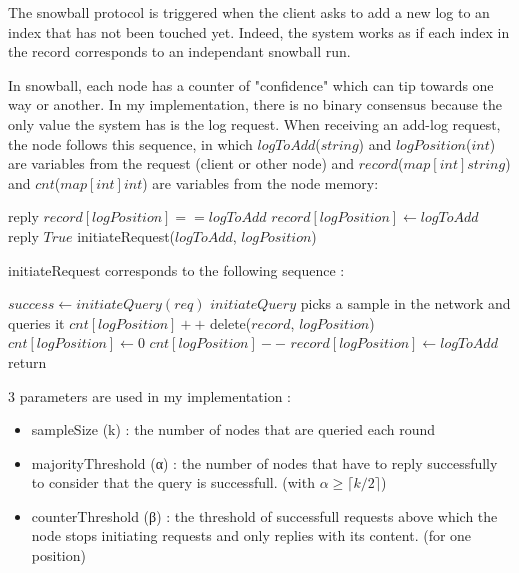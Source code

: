 \documentclass[11pt, twocolumn]{article}
\begin{document}
The snowball protocol is triggered when the client asks to add a new log to an index that has not been touched yet. Indeed, the system works as if each index in the record corresponds to an independant snowball run.

In snowball, each node has a counter of "confidence" which can tip towards one way or another. In my implementation, there is no binary consensus because the only value the system has is the log request.
When receiving an add-log request, the node follows this sequence, in which $logToAdd$($string$) and $logPosition$($int$) are variables from the request (client or other node) and $record$($map[int]string$) and $cnt$($map[int]int$) are variables from the node memory:
\begin{algorithmic}
    \State reply $record[logPosition] == logToAdd$
    \Else
    \State $record[logPosition] \gets logToAdd$
    \State reply $True$
    \State initiateRequest($logToAdd$, $logPosition$)
    \EndIf
\end{algorithmic}

initiateRequest corresponds to the following sequence :

\begin{algorithmic}
    \State $success \gets initiateQuery(req)$
    \State $initiateQuery$ picks a sample in the network and queries it
    \State $cnt[logPosition]++$
    \Else
    \State delete($record$, $logPosition$)
    \State $cnt[logPosition] \gets 0$
    \Else
    \State $cnt[logPosition]--$
    \EndIf
    \EndIf
    \State $record[logPosition] \gets logToAdd$
    \State return
    \EndIf
    \EndWhile
\end{algorithmic}

3 parameters are used in my implementation :
\begin{itemize}
    \item sampleSize (k) : the number of nodes that are queried each round
    \item majorityThreshold (α) : the number of nodes that have to reply successfully to consider that the query is successfull.
          (with $\alpha \geq \lceil k/2 \rceil$)
    \item counterThreshold (β) : the threshold of successfull requests above which the node stops initiating requests and only replies with its content. (for one position)
\end{itemize}
\end{document}
